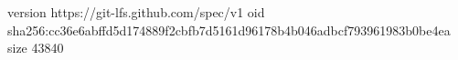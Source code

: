 version https://git-lfs.github.com/spec/v1
oid sha256:cc36e6abffd5d174889f2cbfb7d5161d96178b4b046adbcf793961983b0be4ea
size 43840
